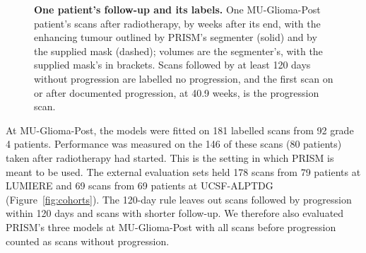 \documentclass[largeformat]{interact} %
\begin{document}
\begin{figure}[!htbp]
\centering
{}
\vspace{-2mm}
\caption{\textbf{One patient's follow-up and its labels.} One MU-Glioma-Post patient's scans after radiotherapy, by
weeks after its end, with the enhancing tumour outlined by PRISM's segmenter (solid) and by the supplied mask (dashed);
volumes are the segmenter's, with the supplied mask's in brackets. Scans followed by at least 120 days without
progression are labelled no progression, and the first scan on or after documented progression, at 40.9 weeks, is the
progression scan.}
\label{fig:patient}
\end{figure}

At MU-Glioma-Post, the models were fitted on 181 labelled scans from 92 grade 4 patients.
Performance was measured on the 146 of these scans (80 patients) taken after radiotherapy had started. This is the setting
in which PRISM is meant to be used. The external evaluation sets held 178 scans from 79 patients at LUMIERE and 69 scans
from 69 patients at UCSF-ALPTDG (Figure~\ref{fig:cohorts}). The 120-day rule leaves out scans followed by progression within 120 days and scans with shorter follow-up.
We therefore also evaluated PRISM's three models at MU-Glioma-Post with all scans before progression counted as scans without
progression.
\end{document}
